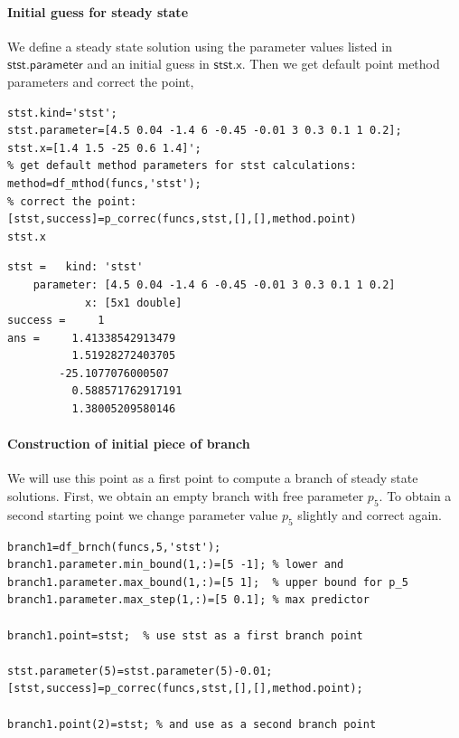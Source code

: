 \documentclass[10pt]{scrartcl}
\newcommand{\parm}[1]{\mathsf{#1}}
\begin{document}
\paragraph{Initial guess for steady state}
We define a steady state solution using the
parameter values listed in $\parm{stst.parameter}$ and an initial
guess in $\parm{stst.x}$. Then we get default point method parameters 
and correct the point,
\begin{lstlisting}
stst.kind='stst';
stst.parameter=[4.5 0.04 -1.4 6 -0.45 -0.01 3 0.3 0.1 1 0.2];
stst.x=[1.4 1.5 -25 0.6 1.4]';
% get default method parameters for stst calculations:
method=df_mthod(funcs,'stst');
% correct the point:
[stst,success]=p_correc(funcs,stst,[],[],method.point)
stst.x  
\end{lstlisting}
{\small
\begin{verbatim}
stst =   kind: 'stst'
    parameter: [4.5 0.04 -1.4 6 -0.45 -0.01 3 0.3 0.1 1 0.2]
            x: [5x1 double]
success =     1
ans =     1.41338542913479
          1.51928272403705
        -25.1077076000507
          0.588571762917191
          1.38005209580146
\end{verbatim}}
\paragraph{Construction of initial piece of branch}
We will use this point as a first point to compute a branch
of steady state solutions. 
First, we obtain an empty branch with free parameter $p_5$.
To obtain a second starting point we change parameter value $p_5$ 
slightly and correct again.
\begin{lstlisting}
branch1=df_brnch(funcs,5,'stst');
branch1.parameter.min_bound(1,:)=[5 -1]; % lower and
branch1.parameter.max_bound(1,:)=[5 1];  % upper bound for p_5
branch1.parameter.max_step(1,:)=[5 0.1]; % max predictor 

branch1.point=stst;  % use stst as a first branch point

stst.parameter(5)=stst.parameter(5)-0.01;                
[stst,success]=p_correc(funcs,stst,[],[],method.point);  

branch1.point(2)=stst; % and use as a second branch point  
\end{lstlisting}
\end{document}
